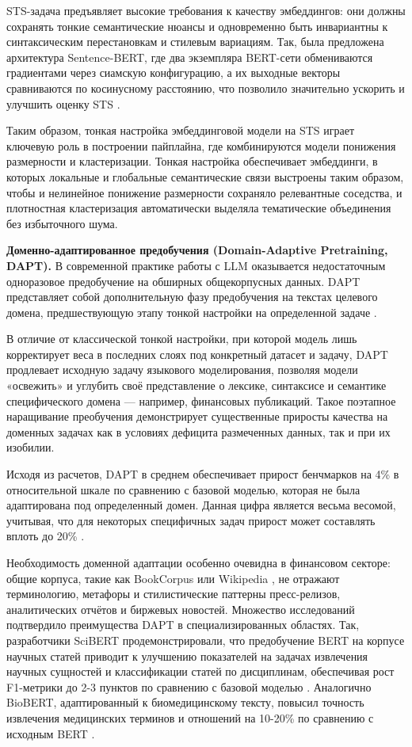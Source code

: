 STS-задача предъявляет высокие требования к качеству эмбеддингов: они должны сохранять тонкие семантические нюансы
и одновременно быть инвариантны к синтаксическим перестановкам и стилевым вариациям. Так, была предложена архитектура
Sentence-BERT, где два экземпляра BERT-сети обмениваются градиентами через сиамскую конфигурацию, а их выходные векторы
сравниваются по косинусному расстоянию, что позволило значительно ускорить и улучшить оценку STS \parencite{SBERT2019}.

Таким образом, тонкая настройка эмбеддинговой модели на STS играет ключевую роль в построении пайплайна, где комбинируются
модели понижения размерности и кластеризации. Тонкая настройка обеспечивает эмбеддинги, в которых локальные и глобальные
семантические связи выстроены таким образом, чтобы и нелинейное понижение размерности сохраняло релевантные соседства,
и плотностная кластеризация автоматически выделяла тематические объединения без избыточного шума.

\textbf{Доменно-адаптированное предобучения (Domain-Adaptive Pretraining, DAPT).} В современной практике работы с
LLM оказывается недостаточным одноразовое предобучение на обширных общекорпусных данных. DAPT представляет собой
дополнительную фазу предобучения на текстах целевого домена, предшествующую этапу тонкой настройки на определенной
задаче \parencite{gururangan2020DAPT}.

В отличие от классической тонкой настройки, при которой модель лишь корректирует веса в последних слоях под конкретный
датасет и задачу, DAPT продлевает исходную задачу языкового моделирования, позволяя модели «освежить» и углубить своё
представление о лексике, синтаксисе и семантике специфического домена --- например, финансовых публикаций. Такое поэтапное
наращивание преобучения демонстрирует существенные приросты качества на доменных задачах как в условиях дефицита
размеченных данных, так и при их изобилии.

Исходя из расчетов, DAPT в среднем обеспечивает прирост бенчмарков на 4\% в относительной шкале по сравнению с базовой
моделью, которая не была адаптирована под определенный домен. Данная цифра является весьма весомой, учитывая, что
для некоторых специфичных задач прирост может составлять вплоть до 20\% \parencite{gururangan2020DAPT}.

Необходимость доменной адаптации особенно очевидна в финансовом секторе: общие корпуса, такие как BookCorpus \parencite{BookCorpus2015}
или Wikipedia \parencite{WikiText2017}, не отражают терминологию, метафоры и стилистические паттерны пресс-релизов, аналитических отчётов
и биржевых новостей. Множество исследований подтвердило преимущества DAPT в специализированных областях. Так,
разработчики SciBERT продемонстрировали, что предобучение BERT на корпусе научных статей приводит к улучшению
показателей на задачах извлечения научных сущностей и классификации статей по дисциплинам, обеспечивая рост
F1-метрики до 2-3 пунктов по сравнению с базовой моделью \parencite{SciBERT2019}. Аналогично BioBERT, адаптированный
к биомедицинскому тексту, повысил точность извлечения медицинских терминов и отношений на 10-20\% по сравнению
с исходным BERT \parencite{BioBERT2020}.


